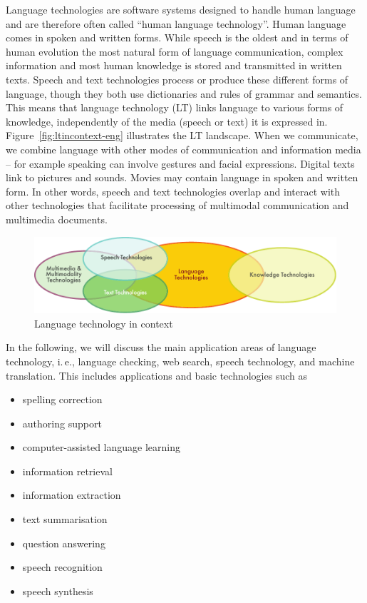 \begin{multicols}{2}
  Language technologies are software systems designed to handle human language and are therefore often called ``human language technology''. Human language comes in spoken and written forms. While speech is the oldest and in terms of human evolution the most natural form of language communication, complex information and most human knowledge is stored and transmitted in written texts. Speech and text technologies process or produce these different forms of language, though they both use dictionaries and rules of grammar and semantics.  This means that language technology (LT) links language to various forms of knowledge, independently of the media (speech or text) it is expressed in. Figure~\ref{fig:ltincontext-eng} illustrates the LT landscape. When we communicate, we combine language with other modes of communication and information media – for example speaking can involve gestures and facial expressions. Digital texts link to pictures and sounds. Movies may contain language in spoken and written form. In other words, speech and text technologies overlap and interact with other technologies that facilitate processing of multimodal communication and multimedia documents.

\begin{figure}[htb]
  \center
  \includegraphics[width=\textwidth]{../_media/english/language_technologies}
  \caption{Language technology in context}
\label{fig:ltincontext_en}
\end{figure}

In the following, we will discuss the main application areas of language technology, i.\,e., language checking, web search, speech technology, and machine translation. This includes applications and basic technologies such as

\begin{itemize}
\item spelling correction
\item authoring support
\item computer-assisted language learning
\item information retrieval
\item information extraction
\item text summarisation
\item question answering
\item speech recognition
\item speech synthesis
\end{itemize}


\end{multicols}
